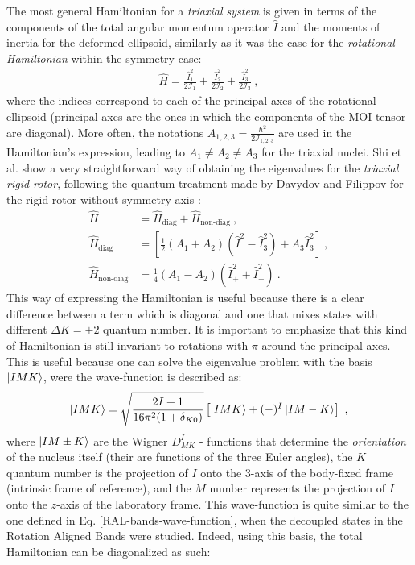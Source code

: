 The most general Hamiltonian for a \emph{triaxial system} is given in terms of the components of the total angular momentum operator $\hat{I}$ and the moments of inertia for the deformed ellipsoid, similarly as it was the case for the \emph{rotational Hamiltonian} within the symmetry case:
\begin{align}
    \hat{H}=\frac{\hat{I}_1^2}{2\mathcal{I}_1}+\frac{\hat{I}_2^2}{2\mathcal{I}_2}+\frac{\hat{I}_3^2}{2\mathcal{I}_3}\ ,
    \label{general-rotor-hamiltonian}
\end{align}
where the indices correspond to each of the principal axes of the rotational ellipsoid (principal axes are the ones in which the components of the MOI tensor are diagonal). More often, the notations $A_{1,2,3}=\frac{\hbar^2}{2\mathcal{I}_{1,2,3}}$ are used in the Hamiltonian's expression, leading to $A_1\neq A_2\neq A_3$ for the triaxial nuclei. Shi et al. \cite{wen2015wobbling} show a very straightforward way of obtaining the eigenvalues for the \emph{triaxial rigid rotor}, following the quantum treatment made by Davydov and Filippov for the rigid rotor without symmetry axis \cite{davydov1958rotational}:
\begin{align}
    \hat{H}&=\hat{H}_\text{diag}+\hat{H}_\text{non-diag}\ ,\nonumber\\
    \hat{H}_\text{diag}&=\left[\frac{1}{2}\left(A_1+A_2\right)\left(\hat{I}^2-\hat{I}_3^2\right)+A_3\hat{I}_3^2\right]\ ,\nonumber\\
    \hat{H}_\text{non-diag}&=\frac{1}{4}\left(A_1-A_2\right)\left(\hat{I}_+^2+\hat{I}_-^2\right)\ .
\end{align}
This way of expressing the Hamiltonian is useful because there is a clear difference between a term which is diagonal and one that mixes states with different $\Delta K=\pm2$ quantum number. It is important to emphasize that this kind of Hamiltonian is still invariant to rotations with $\pi$ around the principal axes. This is useful because one can solve the eigenvalue problem with the basis $\ket{IMK}$, were the wave-function is described as:
\begin{align}
    \ket{IMK}=\sqrt{\frac{2I+1}{16\pi^2(1+\delta_{K0})}}\left[\ket{IMK}+(-)^I\ket{IM-K}\right]\ ,
\end{align}
where $\ket{IM\pm K}$ are the Wigner $D_{MK}^I$ - functions that determine the \emph{orientation} of the nucleus itself (their are functions of the three Euler angles), the $K$ quantum number is the projection of $I$ onto the 3-axis of the body-fixed frame (intrinsic frame of reference), and the $M$ number represents the projection of $I$ onto the $z$-axis of the laboratory frame. This wave-function is quite similar to the one defined in Eq. \ref{RAL-bands-wave-function}, when the decoupled states in the Rotation Aligned Bands were studied. Indeed, using this basis, the total Hamiltonian can be diagonalized \cite{wen2015wobbling} as such:
